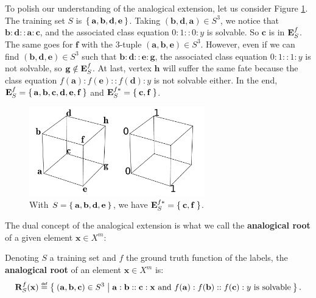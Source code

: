 \begin{testexample}
To polish our understanding of the analogical extension, let us consider Figure
\ref{FIG:ae_example}.
The training set $S$ is $\Set{\mathbf{a}, \mathbf{b}, \mathbf{d},\mathbf{e}}$.
Taking $(\mathbf{b}, \mathbf{d}, \mathbf{a}) \in S^3$, we notice that
$\mathbf{b} : \mathbf{d} :: \mathbf{a} : \mathbf{c}$, and the associated class
equation $0:1::0:y$ is solvable. So $\mathbf{c}$ is in $\mathbf{E}_{S}^{f}$. The same goes for
$\mathbf{f}$ with the 3-tuple $(\mathbf{a}, \mathbf{b}, \mathbf{e}) \in S^3$.
However, even if we can find $(\mathbf{b}, \mathbf{d}, \mathbf{e}) \in S^3$
such that $\mathbf{b} : \mathbf{d} :: \mathbf{e} : \mathbf{g}$, the associated
class equation $0:1::1:y$ is not solvable, so $\mathbf{g} \notin \mathbf{E}_{S}^{f}$. At
last, vertex $\mathbf{h}$ will suffer the same fate because the class equation
$f(\mathbf{a}) : f(\mathbf{e}) :: f(\mathbf{d}) : y$ is not solvable either. In
the end, $\mathbf{E}_{S}^{f} = \set{\mathbf{a}, \mathbf{b}, \mathbf{c}, \mathbf{d},
\mathbf{e}, \mathbf{f}}$ and $\mathbf{E}_{S}^{f*} = \Set{\mathbf{c}, \mathbf{f}}$.
\end{testexample}

\begin{figure}[!h]
\centering
  \includegraphics[width=3in]{figures/ae_example.pdf}
  \caption{With $S = \Set{\mathbf{a}, \mathbf{b}, \mathbf{d},
  \mathbf{e}}$, we have $\mathbf{E}_{S}^{f*} = \Set{\mathbf{c}, \mathbf{f}}$.}
\label{FIG:ae_example}
\end{figure}

The dual concept of the analogical extension is what we call the
\textbf{analogical root} of a given element $\mathbf{x} \in X^m$:

\begin{definition}
  \label{DEF:analogical_root}
  Denoting $S$ a training set and $f$ the ground truth function of the labels,
  the \textbf{analogical root} of an element $\mathbf{x} \in X^m$ is:
  $$
  \rsfx \eqdef \Set{(\mathbf{a}, \mathbf{b}, \mathbf{c}) \in S^3 |
  \mathbf{a}:\mathbf{b}::\mathbf{c}:\mathbf{x} \text{ and }
  f(\mathbf{a}):f(\mathbf{b})::f(\mathbf{c}):y \text{ is solvable}}.
  $$
\end{definition}

